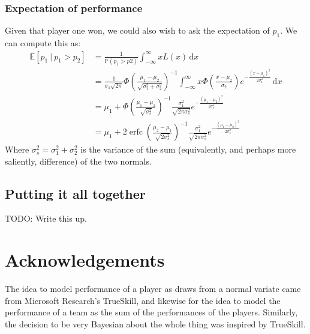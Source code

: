 \documentclass[12pt]{article}
\begin{document}
\subsubsection{Expectation of performance}
Given that player one won, we could also wish to ask the expectation of $p_1$.
We can compute this as:
\begin{align*}
\mathbb{E}[p_1\ |\ p_1 > p_2] &= \frac1{\mathbb{P}(p_1 > p2)} \int_{-\infty}^\infty x L(x) \, \mathrm{d}x \\
&= \frac1{\sigma_1 \sqrt{2\pi}} \Phi\left(\frac{\mu_1 - \mu_2}{\sqrt{\sigma_1^2 + \sigma_2^2}}\right)^{-1}
   \int_{-\infty}^\infty x \Phi\left(\frac{x - \mu_2}{\sigma_2}\right) e^{-\frac{(x - \mu_1)^2}{2 \sigma_1^2}} \, \mathrm{d}x \\
&= \mu_1 + \Phi\left(\frac{\mu_1 - \mu_2}{\sqrt{\sigma_s^2}}\right)^{-1}
   \frac{\sigma_1^2}{\sqrt{2\pi \sigma_s^2}} e^{-\frac{(\mu_1 - \mu_2)^2}{2 \sigma_s^2}} \\
&= \mu_1 + 2 \operatorname{erfc}\left(\frac{\mu_2 - \mu_1}{\sqrt{2 \sigma_s^2}}\right)^{-1}
   \frac{\sigma_1^2}{\sqrt{2\pi \sigma_s^2}} e^{-\frac{(\mu_1 - \mu_2)^2}{2 \sigma_s^2}}
\end{align*}
Where $\sigma_s^2 = \sigma_1^2 + \sigma_2^2$ is the variance of the sum (equivalently, and perhaps more saliently, difference) of the two normals.

\subsection{Putting it all together}
TODO: Write this up.

\section{Acknowledgements}
The idea to model performance of a player as draws from a normal variate came from Microsoft Research's TrueSkill, and likewise for the idea to model the performance of a team as the sum of the performances of the players.
Similarly, the decision to be very Bayesian about the whole thing was inspired by TrueSkill.
\end{document}
